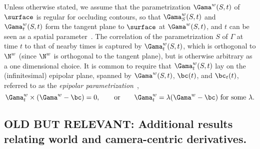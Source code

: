 Unless otherwise stated, we assume that the parametrization $\Gama^w(S,t)$ of $\surface$ is regular for
occluding contours, so that $\Gama^w_S(S,t)$ and $\Gama^w_t(S,t)$ form the
tangent plane to $\surface$ at $\Gama^w(S,t)$, and $t$ can be seen as a
spatial parameter~\cite{Giblin:Weiss:IVC1995}. The
correlation of the parametrization $S$ of $\Gamma$ at time $t$ to that of nearby
times is captured by
$\Gama_t^w(S,t)$, which 
is orthogonal to $\N^w$ (since $\N^w$ is orthogonal to the tangent plane),
but is otherwise arbitrary as a one dimensional choice. It is common to require
that
$\Gama^w_t(S,t)$ lay on the (infinitesimal) epipolar plane, spanned by
$\Gama^w(S,t)$, $\bc(t)$, and $\bc_t(t)$, referred to as the \emph{epipolar
parametrization}~\cite{Giblin:Motion:Book,Giblin:Weiss:IVC1995},
\begin{equation}\label{eq:epipolar:param:eq}
\Gama_t^w\times(\Gama^w-\bc) = 0,\qquad\text{or}\qquad \Gama_t^w =
\lambda(\Gama^w - \bc)\text{ for some $\lambda$.}
\end{equation}


\subsection{OLD BUT RELEVANT: Additional results relating world and camera-centric derivatives.} 

